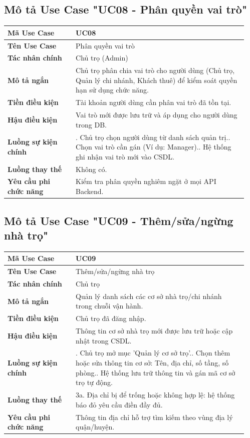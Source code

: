 \documentclass[a4paper,oneside]{report}
\begin{document}
\subsection{Mô tả Use Case "UC08 - Phân quyền vai trò"}

\begin{longtable}[]{@{}>{\RaggedRight\arraybackslash}p{0.27\linewidth}>{\RaggedRight\arraybackslash}p{0.68\linewidth}@{}}
\toprule
\textbf{Mã Use Case} & UC08\tabularnewline
\midrule
\endhead
\textbf{Tên Use Case} & Phân quyền vai trò\tabularnewline
\textbf{Tác nhân chính} & Chủ trọ (Admin)\tabularnewline
\textbf{Mô tả ngắn} & Chủ trọ phân chia vai trò cho người dùng (Chủ trọ,
Quản lý chi nhánh, Khách thuê) để kiểm soát quyền hạn sử dụng chức
năng.\tabularnewline
\textbf{Tiền điều kiện} & Tài khoản người dùng cần phân vai trò đã tồn
tại.\tabularnewline
\textbf{Hậu điều kiện} & Vai trò mới được lưu trữ và áp dụng cho người
dùng trong DB.\tabularnewline
\textbf{Luồng sự kiện chính} & 1. Chủ trọ chọn người
dùng từ danh sách quản trị.\newline 2. Chọn vai trò cần gán (Ví dụ:
Manager).\newline 3. Hệ thống ghi nhận vai trò mới vào
CSDL.\tabularnewline
\textbf{Luồng thay thế} & Không có.\tabularnewline
\textbf{Yêu cầu phi chức năng} & Kiểm tra phân quyền nghiêm ngặt ở mọi
API Backend.\tabularnewline
\bottomrule
\end{longtable}

\subsection{Mô tả Use Case "UC09 - Thêm/sửa/ngừng nhà trọ"}

\begin{longtable}[]{@{}>{\RaggedRight\arraybackslash}p{0.27\linewidth}>{\RaggedRight\arraybackslash}p{0.68\linewidth}@{}}
\toprule
\textbf{Mã Use Case} & UC09\tabularnewline
\midrule
\endhead
\textbf{Tên Use Case} & Thêm/sửa/ngừng nhà trọ\tabularnewline
\textbf{Tác nhân chính} & Chủ trọ\tabularnewline
\textbf{Mô tả ngắn} & Quản lý danh sách các cơ sở nhà trọ/chi nhánh
trong chuỗi vận hành.\tabularnewline
\textbf{Tiền điều kiện} & Chủ trọ đã đăng nhập.\tabularnewline
\textbf{Hậu điều kiện} & Thông tin cơ sở nhà trọ mới được lưu trữ hoặc
cập nhật trong CSDL.\tabularnewline
\textbf{Luồng sự kiện chính} & 1. Chủ trọ mở mục
'Quản lý cơ sở trọ'.\newline 2. Chọn thêm hoặc sửa thông tin cơ sở:
Tên, địa chỉ, số tầng, số phòng.\newline 3. Hệ thống lưu trữ thông
tin và gán mã cơ sở trọ tự động.\tabularnewline
\textbf{Luồng thay thế} & 3a. Địa chỉ bị để trống hoặc không hợp lệ: hệ
thống báo đỏ yêu cầu điền đầy đủ.\tabularnewline
\textbf{Yêu cầu phi chức năng} & Thông tin địa chỉ hỗ trợ tìm kiếm theo
vùng địa lý quận/huyện.\tabularnewline
\bottomrule
\end{longtable}
\end{document}
